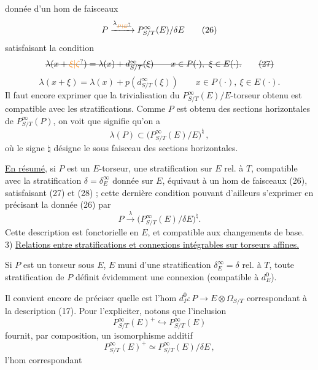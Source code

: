 donnée d'un hom de faisceaux
\[
 P \xrightarrow{\lambda_{\deleted{\unsure{P|E}}}} P^\infty_{S/T}(E)/\delta E \tag*{(26)}
\]
satisfaisant la condition
\[
 \deleted{\lambda(x+\unsure{\xi|\zeta})=\lambda(x)+d^\infty_{S/T}(\xi)\qquad x\in P(\cdot),\ \xi\in E(\cdot).} \tag*{\deleted{(27)}}
\]
\[
 \lambda(x+\xi)=\lambda(x)+p(d^\infty_{S/T}(\xi))\qquad x\in P(\cdot),\ \xi\in E(\cdot). \tag*{(27)}
\]
Il faut encore exprimer que la trivialisation du $P^\infty_{S/T}(E)/E$-torseur obtenu est compatible avec les stratifications. Comme $P$ est  obtenu des sections horizontales de $P^\infty_{S/T}(P)$, on voit que 
  signifie qu'on a
\[
 \lambda(P)\subset\bigl(P^\infty_{S/T}(E)/E\bigr)^{\natural} \,, \tag*{(28)}
\]
où le  signe $\natural$ désigne le sous faisceau des sections horizontales.

 \uline{En résumé},  si $P$ est un $E$-torseur, une stratification sur $E$ rel. à $T$, compatible avec la stratification $\delta=\delta^\infty_E$ donnée sur $E$, équivaut à un hom de faisceaux (26), satisfaisant (27) et (28) ; cette dernière condition pouvant d'ailleurs s'exprimer en précisant la donnée (26) par
\[
 P\xrightarrow{\lambda}\bigl(P^\infty_{S/T}(E)/\delta E\bigr)^\natural . \tag*{(26$'$)}
\]
Cette description est fonctorielle en $E$, et compatible aux changements de base.
3) \uline{Relations entre stratifications et connexions intégrables sur torseurs affines.}

Si $P$ est un torseur sous $E$, $E$ muni d'une stratification $\delta^\infty_E=\delta$ rel. à $T$, toute stratification de $P$  définit évidemment une connexion (compatible à $d^0_E$).


Il convient encore de préciser quelle est l'hom $d^0_P:P\longrightarrow E\otimes\Omega_{S/T}$ correspondant à la description (17). Pour l'expliciter, notons que l'inclusion
\[
 P^\infty_{S/T}(E)^+\hookrightarrow P^\infty_{S/T}(E)
\]
fournit, par composition, un isomorphisme additif
\[
 P^\infty_{S/T}(E)^+\simeq P^\infty_{S/T}(E)/\delta E \,, \tag*{(29)}
\]
\margin{Définir les sections \deleted{\unsure{hom|hor}} \uline{intégrables} de $P^\infty_{S/T}(E)^+$ comme celles correspondant aux \deleted{\unsure{éléments}} \inserted{sections} de $\bigl(P^\infty_{S/T}(E)/\delta E\bigr)^\natural$, et introduire la notation $P^\infty_{S/T}(E)^+$ [Mais Attention, $P^\infty_{S/T}(E)^+\hookrightarrow P^\infty_{S/T}(E)$ \uline{n'est pas} compatible avec stratifications}
l'hom correspondant

